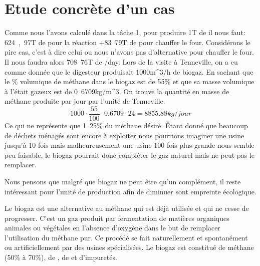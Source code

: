 \documentclass[10pt,a4paper]{article}
\begin{document}
\section{Etude concrète d'un cas}
Comme nous l'avons calculé dans la tâche 1, pour produire \unit{1}{T} de  il nous faut: \unit{624,97}{T} de  pour la réaction +\unit{83.79}{T} de  pour chauffer le four. Considérons le pire cas, c'est à dire celui ou nous n'avons pas d'alternative pour chauffer le four. 
Il nous faudra alors \unit{708.76}{T} de /day.
Lors de la visite à Tenneville, on a eu comme donnée que le digesteur produisait \unit{1000}{m^3/h} de biogaz. En sachant que le \% volumique de méthane dans le biogaz est de \unit{55}{\%} et que sa masse volumique à l'était gazeux est de \unit{0.6709}{kg/m^3}. On trouve la quantité en masse de méthane produite par jour par l'unité de Tenneville.
\begin{equation}
1000\cdot \dfrac{55}{100}\cdot 0.6709\cdot 24 = \unit{8855.88}{kg/jour}
\end{equation}
Ce qui ne représente que \unit{1.25}{\%} du méthane désiré.
Étant donné que beaucoup de déchets ménagés sont encore à exploiter nous pourrions imaginer une usine jusqu'à 10 fois mais malheureusement une usine 100 fois plus grande nous semble peu faisable, le biogaz pourrait donc compléter le gaz naturel mais ne peut pas le remplacer.

Nous pensons que malgré que biogaz ne peut être qu'un complément, il reste intéressant pour l'unité de production afin de diminuer sont empreinte écologique.






















\newpage

Le biogaz est une alternative au méthane qui est déjà utilisée et qui ne cesse de progresser. C'est un gaz produit par fermentation de matières organiques animales ou végétales en l'absence d'oxygène dans le but de remplacer l'utilisation du méthane pur. Ce procédé se fait naturellement et spontanément ou artificiellement par des usines spécialisées. Le biogaz est constitué de méthane (50\% à 70\%), de , de  et d'impuretés. 
\end{document}
